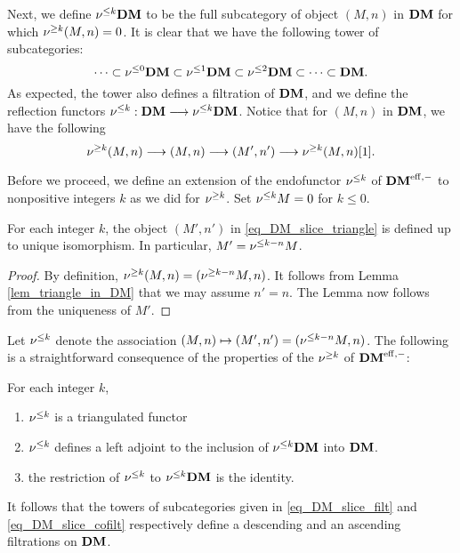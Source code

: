 Next, we define $\nu^{\leq k} \mathbf{DM}$ to be the full subcategory of 
object $(M, n)$ in $\mathbf{DM}$ for which $\nu^{\geq k}(M, n) = 0$. It is
clear that we have the following tower of subcategories:
\begin{equation}\label{eq_DM_slice_cofilt}
\cdots \subset \nu^{\leq 0}\mathbf{DM} \subset \nu^{\leq 1}\mathbf{DM} \subset \nu^{\leq 2}\mathbf{DM} 
   \subset \cdots \subset \mathbf{DM}.
\end{equation}
As expected, the tower also defines a filtration of $\mathbf{DM}$, and
we define the reflection functors $\nu^{\leq k} : \mathbf{DM} \longrightarrow \nu^{\leq k} \mathbf{DM}$.
Notice that for $(M, n)$ in $\mathbf{DM}$, we have the following
\begin{equation}\label{eq_DM_slice_triangle}
\nu^{\geq k} (M, n) \longrightarrow (M, n) \longrightarrow (M', n') \longrightarrow \nu^{\geq k} (M, n)[1].
\end{equation}

Before we proceed, we define an extension of the endofunctor 
$\nu^{\leq k}$ of $\mathbf{DM}^{\mathrm{eff},-}$ to nonpositive integers $k$ as we did for 
$\nu^{\geq k}$. Set $\nu^{\leq k} M = 0$ for $k \leq 0$.

\begin{lem}
For each integer $k$, the object $(M', n')$ in 
\eqref{eq_DM_slice_triangle} is defined up to unique isomorphism. 
In particular, $M' = \nu^{\leq k - n} M$.
\end{lem}
\begin{proof}
By definition, $\nu^{\geq k}(M, n) = (\nu^{\geq k - n}M, n)$. It follows 
from Lemma \ref{lem_triangle_in_DM} that we may assume $n' = n$. 
The Lemma now follows from the uniqueness of $M'$.
\end{proof}

Let $\nu^{\leq k}$ denote the association $(M, n) \mapsto (M', n') =
(\nu^{\leq k - n}M, n)$. The following is a straightforward consequence
of the properties of the $\nu^{\geq k}$ of $\mathbf{DM}^{\mathrm{eff},-}$:

\begin{prop}
For each integer $k$,
\begin{enumerate}
\item $\nu^{\leq k}$ is a triangulated functor

\item $\nu^{\leq k}$ defines a left adjoint to the inclusion of $\nu^{\leq k}\mathbf{DM}$
into $\mathbf{DM}$.

\item the restriction of $\nu^{\leq k}$ to $\nu^{\leq k}\mathbf{DM}$ is the identity.
\end{enumerate}
\end{prop}

It follows that the towers of subcategories given in 
\eqref{eq_DM_slice_filt} and \eqref{eq_DM_slice_cofilt} 
respectively define a descending and an ascending filtrations on 
$\mathbf{DM}$.

